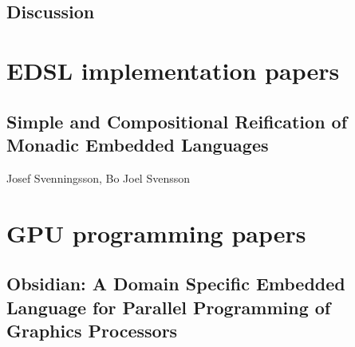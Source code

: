 \documentclass[a4paper]{book}
\newcommand{\paperBB}{Simple and Compositional Reification of Monadic Embedded Languages}
\newcommand{\paperIFL}{Obsidian: A Domain Specific Embedded Language for Parallel Programming of Graphics Processors}
\begin{document}
\section{Discussion} 




\clearpage{}

%
%


\chapter{EDSL implementation papers}
\label{chap:EDSLImplementation}
% 
\cleardoublepage 


\section{\paperBB}
\label{sec:paperBB}

\begin{center} 
Josef Svenningsson, Bo Joel Svensson
\end{center}






\chapter{GPU programming papers}
\label{chap:GPUProgramming}

% 
\cleardoublepage 

\section{\paperIFL}
\label{sec:paperIFL}
\end{document}
